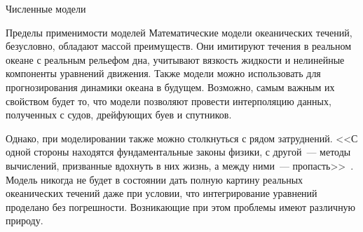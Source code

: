 \begin{chapter}{Численные модели}
\begin{section}{Пределы применимости моделей}
%
Математические модели океанических течений, безусловно, обладают массой
преимуществ. Они имитируют течения в реальном океане с реальным
рельефом дна, учитывают вязкость жидкости и нелинейные компоненты уравнений
движения. Также модели можно использовать для прогнозирования динамики
океана в будущем. Возможно, самым важным их свойством будет то, что модели 
позволяют провести интерполяцию данных, полученных с судов, дрейфующих
буев и спутников.
%

Однако, при моделировании также можно столкнуться с рядом затруднений. 
<<С одной стороны находятся фундаментальные законы физики, с другой~---
методы вычислений, призванные вдохнуть в них жизнь, а между ними~---
пропасть>>~\cite{Berlinski:1996}. Модель никогда не будет
в состоянии дать полную картину реальных океанических течений даже при
условии, что интегрирование уравнений проделано без погрешности. Возникающие
при этом проблемы имеют различную природу.
%


\end{section}
\end{chapter}
